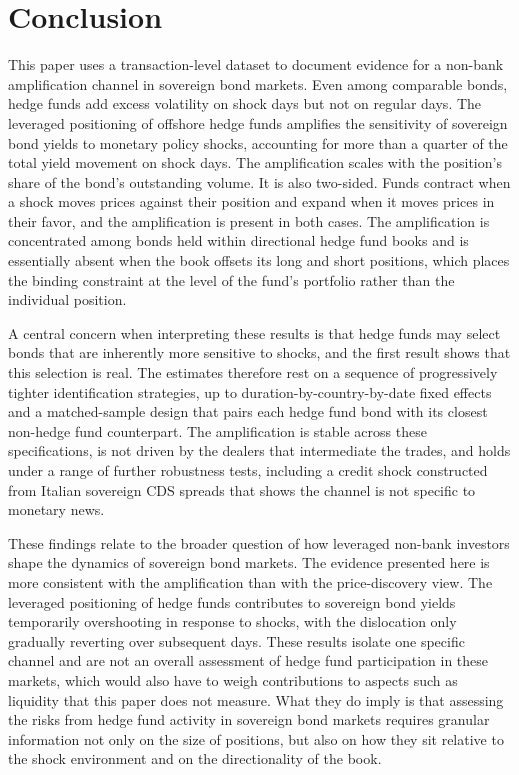 \documentclass[english, 11pt, oneside]{article}
\begin{document}
\section{Conclusion}
\label{sec:conclusion}
This paper uses a transaction-level dataset to document evidence for a non-bank amplification channel in sovereign bond markets. Even among comparable bonds, hedge funds add excess volatility on shock days but not on regular days. The leveraged positioning of offshore hedge funds amplifies the sensitivity of sovereign bond yields to monetary policy shocks, accounting for more than a quarter of the total yield movement on shock days. The amplification scales with the position's share of the bond's outstanding volume. It is also two-sided. Funds contract when a shock moves prices against their position and expand when it moves prices in their favor, and the amplification is present in both cases. The amplification is concentrated among bonds held within directional hedge fund books and is essentially absent when the book offsets its long and short positions, which places the binding constraint at the level of the fund's portfolio rather than the individual position.

A central concern when interpreting these results is that hedge funds may select bonds that are inherently more sensitive to shocks, and the first result shows that this selection is real. The estimates therefore rest on a sequence of progressively tighter identification strategies, up to duration-by-country-by-date fixed effects and a matched-sample design that pairs each hedge fund bond with its closest non-hedge fund counterpart. The amplification is stable across these specifications, is not driven by the dealers that intermediate the trades, and holds under a range of further robustness tests, including a credit shock constructed from Italian sovereign CDS spreads that shows the channel is not specific to monetary news. 

These findings relate to the broader question of how leveraged non-bank investors shape the dynamics of sovereign bond markets. The evidence presented here is more consistent with the amplification than with the price-discovery view. The leveraged positioning of hedge funds contributes to sovereign bond yields temporarily overshooting in response to shocks, with the dislocation only gradually reverting over subsequent days. These results isolate one specific channel and are not an overall assessment of hedge fund participation in these markets, which would also have to weigh contributions to aspects such as liquidity that this paper does not measure. What they do imply is that assessing the risks from hedge fund activity in sovereign bond markets requires granular information not only on the size of positions, but also on how they sit relative to the shock environment and on the directionality of the book.
\end{document}
